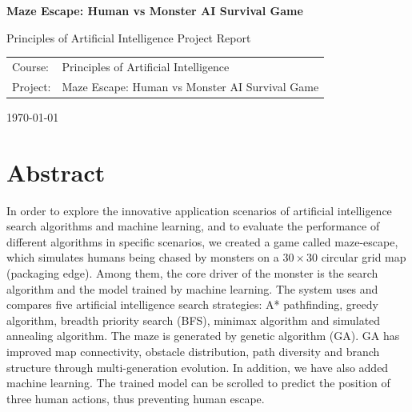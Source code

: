 \documentclass[12pt,a4paper]{article}
\begin{document}
\begin{titlepage}

\centering

\vspace*{2cm}

{\Huge\bfseries Maze Escape: Human vs Monster AI Survival Game\par}

\vspace{1.5cm}

{\Large Principles of Artificial Intelligence Project Report\par}



\vspace{2cm}

\begin{tabular}{ll}
Course: & Principles of Artificial Intelligence\\
Project: & Maze Escape: Human vs Monster AI Survival Game\\
\end{tabular}

\vfill

{\large \today}

\end{titlepage}

\tableofcontents
\newpage

\section*{Abstract}

In order to explore the innovative application scenarios of artificial intelligence search algorithms and machine learning, and to evaluate the performance of different algorithms in specific scenarios, we created a game called maze-escape, which simulates humans being chased by monsters on a $30\times30$ circular grid map (packaging edge). Among them, the core driver of the monster is the search algorithm and the model trained by machine learning. The system uses and compares five artificial intelligence search strategies: A* pathfinding, greedy algorithm, breadth priority search (BFS), minimax algorithm and simulated annealing algorithm. The maze is generated by genetic algorithm (GA). GA has improved map connectivity, obstacle distribution, path diversity and branch structure through multi-generation evolution. In addition, we have also added machine learning. The trained model can be scrolled to predict the position of three human actions, thus preventing human escape. 
\end{document}
